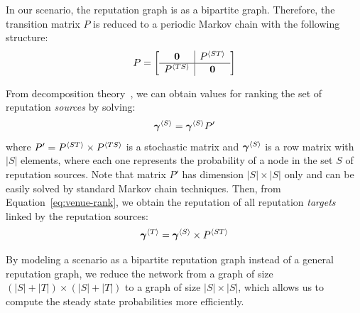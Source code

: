 \documentclass[notitlepage]{svjour3}
\begin{document}

In our scenario, the reputation graph is as a bipartite graph. Therefore, the transition matrix $P$ is reduced to a periodic Markov chain with the following structure:
\begin{align}\label{eq:p}
P 
=
\left[
\begin{array}{c | c}
{\bf 0}      &P{^{\langle ST \rangle}} \\
\hline
P{^{\langle TS \rangle}}  &{\bf 0}    \\
\end{array}
\right]
\end{align}

From decomposition theory~\cite{meyer89}, we can obtain values for ranking the set of reputation {\em sources} by solving:
\begin{align}
\label{eq:top-rank}
{\mbox{\boldmath $\gamma$}}{^{\langle S \rangle}} = {\mbox{\boldmath $\gamma$}}{^{\langle S \rangle}} P'
\end{align}
\noindent where $P^\prime = P{^{\langle ST \rangle}} \times P{^{\langle TS \rangle}}$ is a stochastic matrix and ${\mbox{\boldmath $\gamma$}}{^{\langle S \rangle}}$ is a row matrix with $|S|$ elements, where each one represents the probability of a node in the set $S$ of reputation sources.
%
Note that matrix $P'$ has dimension $|S| \times |S|$ only and can be easily solved by standard Markov chain techniques.
Then, from Equation~\eqref{eq:venue-rank}, we obtain the reputation of all reputation \emph{targets} linked by the reputation sources:
\begin{align}
\label{eq:venue-rank}
{\mbox{\boldmath $\gamma$}}{^{\langle T \rangle}} = {\mbox{\boldmath $\gamma$}}{^{\langle S \rangle}} \times P{^{\langle ST \rangle}}
\end{align}

By modeling a scenario as a bipartite reputation graph instead of a general reputation graph, we reduce the network from a graph of size $(|S|+|T|)\times (|S|+|T|)$ to a graph of size $|S|\times |S|$, which allows us to compute the steady state probabilities more efficiently. %
\end{document}
